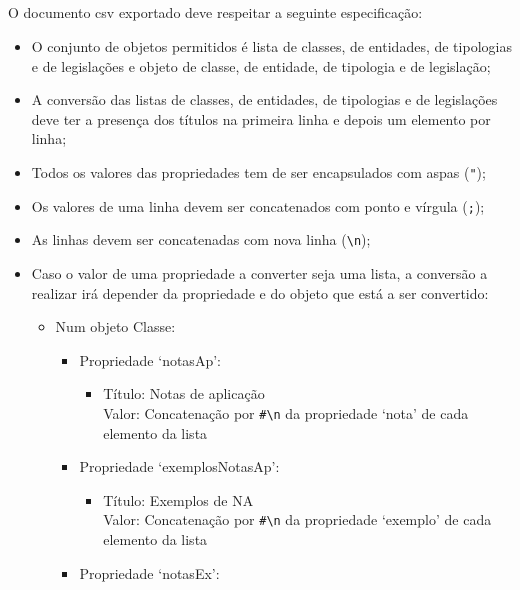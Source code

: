 \subsection{}

O documento \acrshort{csv} exportado deve respeitar a seguinte especificação:
\begin{itemize}
    \item O conjunto de objetos permitidos é lista de classes, de entidades, de tipologias e de legislações 
    e objeto de classe, de entidade, de tipologia e de legislação;
    \item A conversão das listas de classes, de entidades, de tipologias e de legislações deve ter a presença 
    dos títulos na primeira linha e depois um elemento por linha;
    \item Todos os valores das propriedades tem de ser encapsulados com aspas (\verb|"|);
    \item Os valores de uma linha devem ser concatenados com ponto e vírgula (\verb|;|);
    \item As linhas devem ser concatenadas com nova linha (\verb|\n|);
    \item Caso o valor de uma propriedade a converter seja uma lista, a conversão a realizar irá depender da 
    propriedade e do objeto que está a ser convertido: 
    \begin{itemize}
        \item Num objeto Classe:
        \begin{itemize}
            \item Propriedade `notasAp':
            \begin{itemize}
                \item Título: Notas de aplicação \\
                      Valor: Concatenação por \verb|#\n| da propriedade `nota' de cada elemento da lista
            \end{itemize}
            \item Propriedade `exemplosNotasAp':
            \begin{itemize}
                \item Título: Exemplos de NA \\
                      Valor: Concatenação por \verb|#\n| da propriedade `exemplo' de cada elemento da lista
            \end{itemize}
            \item Propriedade `notasEx':
            \begin{itemize}

\end{itemize}
\end{itemize}
\end{itemize}
\end{itemize}
